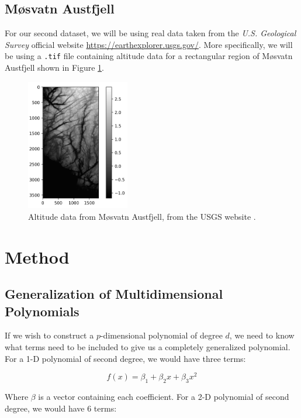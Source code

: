 \documentclass[a4paper,10pt,english]{article}
\begin{document}
\begin{multicols*}{2}
\subsection*{Møsvatn Austfjell}

For our second dataset, we will be using real data taken from the \textit{U.S. Geological Survey} \cite{earthexplorer} official website \url{https://earthexplorer.usgs.gov/}.  More specifically, we will be using a \texttt{.tif} file containing altitude data for a rectangular region of Møsvatn Austfjell shown in Figure \ref{fig_austfjell}.

\begin{figure}[H]
	\centering
	\includegraphics[width = 0.4\textwidth, center]{real_data.png}
	\caption{Altitude data from Møsvatn Austfjell, from the USGS website \cite{earthexplorer}.\label{fig_austfjell}}
\end{figure}	

\section*{Method}

\subsection*{Generalization of Multidimensional Polynomials}

If we wish to construct a $p$-dimensional polynomial of degree $d$, we need to know what terms need to be included to give us a completely generalized polynomial.  For a 1-D polynomial of second degree, we would have three terms:

\begin{equation*}
f(x) = \beta_1 + \beta_2 x + \beta_3 x^2
\end{equation*}

Where $\beta$ is a vector containing each coefficient.	For a 2-D polynomial of second degree, we would have 6 terms:


\end{multicols*}
\end{document}
